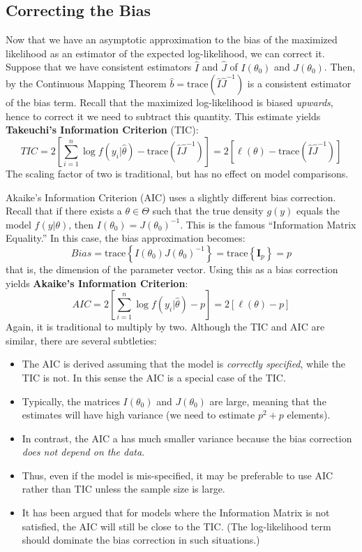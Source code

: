 \documentclass[12pt]{article}
\theoremstyle{definition}
\begin{document}
\subsection{Correcting the Bias}
Now that we have an asymptotic approximation to the bias of the maximized likelihood as an estimator of the expected log-likelihood, we can correct it. Suppose that we have consistent estimators $\hat{I}$ and $\hat{J}$ of $I(\theta_0)$ and $J(\theta_0)$. Then, by the Continuous Mapping Theorem $\hat{b}=\mbox{trace}(\hat{I}\hat{J}^{-1})$ is a consistent estimator of the bias term. Recall that the maximized log-likelihood is biased \emph{upwards}, hence to correct it we need to subtract this quantity. This estimate yields \textbf{Takeuchi's Information Criterion} (TIC):
	$$TIC = 2\left[ \sum_{i=1}^n \log{f\left( y_i | \hat{\theta} \right)} - \mbox{trace}(\hat{I}\hat{J}^{-1}) \right] = 2 \left[\ell(\theta) - \mbox{trace}\left(\widehat{I}\widehat{J}^{-1}\right) \right]$$
The scaling factor of two is traditional, but has no effect on model comparisons.

Akaike's Information Criterion (AIC) uses a slightly different bias correction. Recall that if there exists a $\theta \in \Theta$ such that the true density $g(y)$ equals the model $f(y|\theta)$, then $I(\theta_0)=J(\theta_0)^{-1}$. This is the famous ``Information Matrix Equality.'' In this case, the bias approximation becomes:
	$$Bias = \mbox{trace}\left\{ I(\theta_0)J(\theta_0)^{-1} \right\} = \mbox{trace}\left\{ \mathbf{I}_p \right\}=p$$
that is, the dimension of the parameter vector. Using this as a bias correction yields \textbf{Akaike's Information Criterion}:
	$$AIC = 2\left[ \sum_{i=1}^n \log{f\left( y_i | \hat{\theta} \right)} - p \right] = 2\left[ \ell(\theta) - p \right]$$
Again, it is traditional to multiply by two. Although the TIC and AIC are similar, there are several subtleties:
	\begin{itemize}
		\item The AIC is derived assuming that the model is \emph{correctly specified}, while the TIC is not. In this sense the AIC is a special case of the TIC.
		\item Typically, the matrices $I(\theta_0)$ and $J(\theta_0)$ are large, meaning that the estimates will have high variance (we need to estimate $p^2 + p$ elements).
		\item In contrast, the AIC a has much smaller variance because the bias correction \emph{does not depend on the data}. 
		\item Thus, even if the model is mis-specified, it may be preferable to use AIC rather than TIC unless the sample size is large.
		\item It has been argued that for models where the Information Matrix is not satisfied, the AIC will still be close to the TIC. (The log-likelihood term should dominate the bias correction in such situations.)
	\end{itemize}
\end{document}

